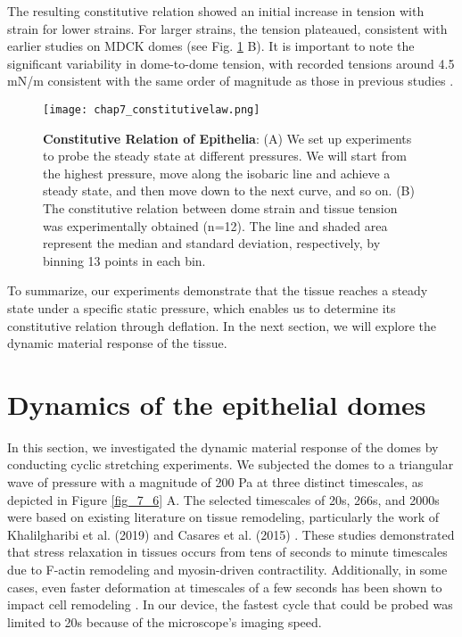 The resulting constitutive relation showed an initial increase in tension with strain for lower strains. For larger strains, the tension plateaued, consistent with earlier studies on MDCK domes (see Fig. \ref{fig_7_5} B). It is important to note the significant variability in dome-to-dome tension, with recorded tensions around 4.5 \unit{mN/m} consistent with the same order of magnitude as those in previous studies \cite{latorre2018,marin-llaurado2022}.

\begin{figure}[b!]
	\centering
	\texttt{[image: chap7\_constitutivelaw.png]}
	\caption{\label{fig_7_5} \textbf{Constitutive Relation of Epithelia}: (A) We set up experiments to probe the steady state at different pressures. We will start from the highest pressure, move along the isobaric line and achieve a steady state, and then move down to the next curve, and so on.	(B) The constitutive relation between dome strain and tissue tension was experimentally obtained (n=12). The line and shaded area represent the median and standard deviation, respectively, by binning 13 points in each bin.}
\end{figure}

To summarize, our experiments demonstrate that the tissue reaches a steady state under a specific static pressure, which enables us to determine its constitutive relation through deflation. In the next section, we will explore the dynamic material response of the tissue.

\vspace{0cm}

\hypertarget{dynamics-of-the-epithelia-domes}{\section{Dynamics of the epithelial domes}\label{dynamics-of-the-epithelial-domes}}

In this section, we investigated the dynamic material response of the domes by conducting cyclic stretching experiments. We subjected the domes to a triangular wave of pressure with a magnitude of 200 Pa at three distinct timescales, as depicted in Figure \ref{fig_7_6} A. The selected timescales of 20s, 266s, and 2000s were based on existing literature on tissue remodeling, particularly the work of Khalilgharibi et al. (2019) and Casares et al. (2015) \cite{khalilgharibi2019, casares2015}. These studies demonstrated that stress relaxation in tissues occurs from tens of seconds to minute timescales due to F-actin remodeling and myosin-driven contractility. Additionally, in some cases, even faster deformation at timescales of a few seconds has been shown to impact cell remodeling \cite{andreu2021a}. In our device, the fastest cycle that could be probed was limited to 20s because of the microscope’s imaging speed.

